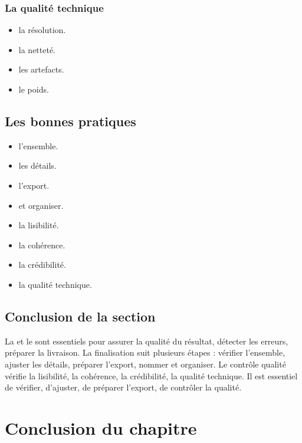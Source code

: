 \subsubsection{La qualité technique}

\begin{itemize}
    \item {} la résolution.
    \item {} la netteté.
    \item {} les artefacts.
    \item {} le poids.
\end{itemize}

\subsection{Les bonnes pratiques}

\begin{itemize}
    \item {} l'ensemble.
    \item {} les détails.
    \item {} l'export.
    \item {} et organiser.
    \item {} la lisibilité.
    \item {} la cohérence.
    \item {} la crédibilité.
    \item {} la qualité technique.
\end{itemize}

\subsection*{Conclusion de la section}

La  et le  sont essentiels pour assurer la qualité du résultat, détecter les erreurs, préparer la livraison. La finalisation suit plusieurs étapes : vérifier l'ensemble, ajuster les détails, préparer l'export, nommer et organiser. Le contrôle qualité vérifie la lisibilité, la cohérence, la crédibilité, la qualité technique. Il est essentiel de vérifier, d'ajuster, de préparer l'export, de contrôler la qualité.

\section*{Conclusion du chapitre}

